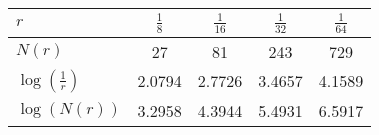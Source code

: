 \UseRawInputEncoding
{\tabulinesep=1.5mm
\begin{tabu}{|l|cccc|}
\hline
$r$ & $\displaystyle\frac{1}{8}$ & $\displaystyle\frac{1}{16}$ & $\displaystyle\frac{1}{32}$ & $\displaystyle\frac{1}{64}$\\
\hline
$N(r)$ & 27 & 81 & 243 & 729 \\
\hline
$\log\left(\displaystyle\frac{1}{r}\right)$ & 2.0794 & 2.7726 & 3.4657 & 4.1589\\
\hline
$\log(N(r))$ & 3.2958 & 4.3944 & 5.4931 & 6.5917\\
\hline
\end{tabu}}
